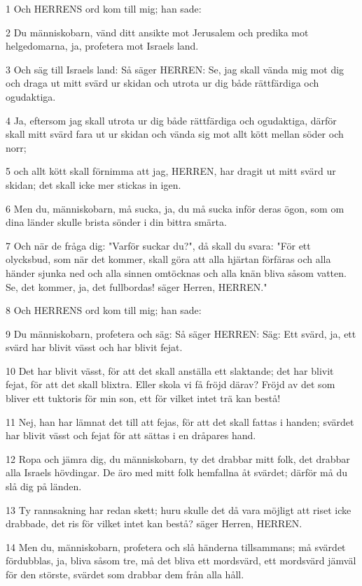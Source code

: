 \par 1 Och HERRENS ord kom till mig; han sade:
\par 2 Du människobarn, vänd ditt ansikte mot Jerusalem och predika mot helgedomarna, ja, profetera mot Israels land.
\par 3 Och säg till Israels land: Så säger HERREN: Se, jag skall vända mig mot dig och draga ut mitt svärd ur skidan och utrota ur dig både rättfärdiga och ogudaktiga.
\par 4 Ja, eftersom jag skall utrota ur dig både rättfärdiga och ogudaktiga, därför skall mitt svärd fara ut ur skidan och vända sig mot allt kött mellan söder och norr;
\par 5 och allt kött skall förnimma att jag, HERREN, har dragit ut mitt svärd ur skidan; det skall icke mer stickas in igen.
\par 6 Men du, människobarn, må sucka, ja, du må sucka inför deras ögon, som om dina länder skulle brista sönder i din bittra smärta.
\par 7 Och när de fråga dig: "Varför suckar du?", då skall du svara: "För ett olycksbud, som när det kommer, skall göra att alla hjärtan förfäras och alla händer sjunka ned och alla sinnen omtöcknas och alla knän bliva såsom vatten. Se, det kommer, ja, det fullbordas! säger Herren, HERREN."
\par 8 Och HERRENS ord kom till mig; han sade:
\par 9 Du människobarn, profetera och säg: Så säger HERREN: Säg: Ett svärd, ja, ett svärd har blivit vässt och har blivit fejat.
\par 10 Det har blivit vässt, för att det skall anställa ett slaktande; det har blivit fejat, för att det skall blixtra. Eller skola vi få fröjd därav? Fröjd av det som bliver ett tuktoris för min son, ett för vilket intet trä kan bestå!
\par 11 Nej, han har lämnat det till att fejas, för att det skall fattas i handen; svärdet har blivit vässt och fejat för att sättas i en dråpares hand.
\par 12 Ropa och jämra dig, du människobarn, ty det drabbar mitt folk, det drabbar alla Israels hövdingar. De äro med mitt folk hemfallna åt svärdet; därför må du slå dig på länden.
\par 13 Ty rannsakning har redan skett; huru skulle det då vara möjligt att riset icke drabbade, det ris för vilket intet kan bestå? säger Herren, HERREN.
\par 14 Men du, människobarn, profetera och slå händerna tillsammans; må svärdet fördubblas, ja, bliva såsom tre, må det bliva ett mordsvärd, ett mordsvärd jämväl för den störste, svärdet som drabbar dem från alla håll.
